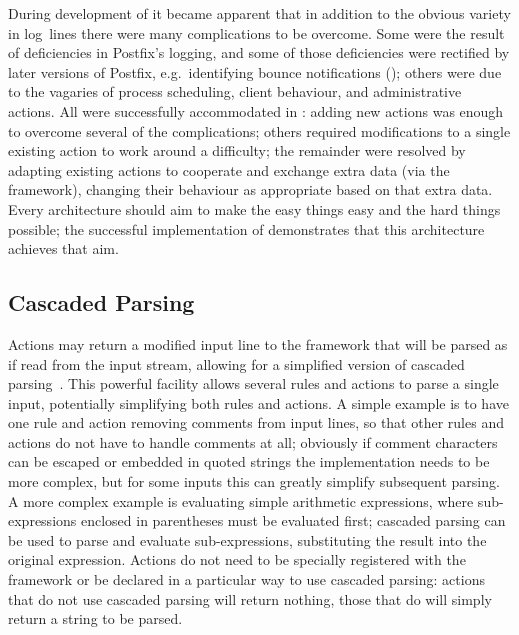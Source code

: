 During development of \parsername{} it became apparent that in addition to
the obvious variety in log~lines there were many complications to be
overcome.  Some were the result of deficiencies in Postfix's logging, and
some of those deficiencies were rectified by later versions of Postfix,
e.g.\ identifying bounce notifications
(); others were due to the
vagaries of process scheduling, client behaviour, and administrative
actions.  All were successfully accommodated in \parsername{}: adding new
actions was enough to overcome several of the complications; others
required modifications to a single existing action to work around a
difficulty; the remainder were resolved by adapting existing actions to
cooperate and exchange extra data (via the framework), changing their
behaviour as appropriate based on that extra data.  Every architecture
should aim to make the easy things easy and the hard things possible; the
successful implementation of \parsername{} demonstrates that this
architecture achieves that aim.

\subsection{Cascaded Parsing}

\label{cascaded parsing}

Actions may return a modified input line to the framework that will be
parsed as if read from the input stream, allowing for a simplified version
of cascaded parsing~\cite{cascaded-parsing}.  This powerful facility allows
several rules and actions to parse a single input, potentially simplifying
both rules and actions.  A simple example is to have one rule and action
removing comments from input lines, so that other rules and actions do not
have to handle comments at all; obviously if comment characters can be
escaped or embedded in quoted strings the implementation needs to be more
complex, but for some inputs this can greatly simplify subsequent parsing.
A more complex example is evaluating simple arithmetic expressions, where
sub-expressions enclosed in parentheses must be evaluated first; cascaded
parsing can be used to parse and evaluate sub-expressions, substituting the
result into the original expression.  Actions do not need to be specially
registered with the framework or be declared in a particular way to use
cascaded parsing: actions that do not use cascaded parsing will return
nothing, those that do will simply return a string to be parsed.

